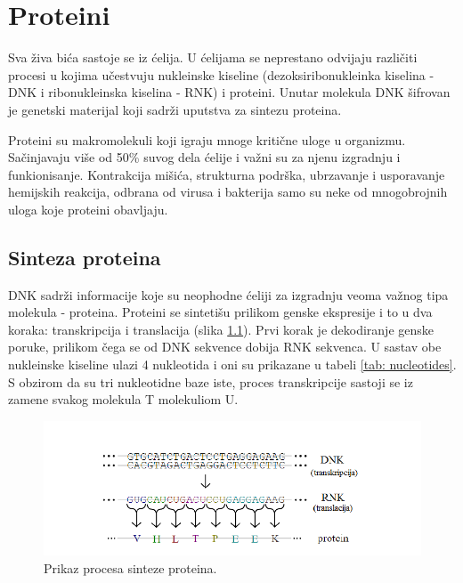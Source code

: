 \chapter{Proteini} %
\label{Chapter2}

Sva živa bića sastoje se iz ćelija. U ćelijama se neprestano odvijaju različiti procesi u kojima učestvuju nukleinske kiseline (dezoksiribonukleinka kiselina - DNK i ribonukleinska kiselina - RNK) i proteini. Unutar molekula DNK šifrovan je genetski materijal koji sadrži uputstva za sintezu proteina. 

Proteini su makromolekuli koji igraju mnoge kritične uloge u organizmu. Sačinjavaju više od 50\% suvog dela ćelije i važni su za njenu izgradnju i funkionisanje. Kontrakcija mišića, strukturna podrška, ubrzavanje i usporavanje hemijskih reakcija, odbrana od virusa i bakterija samo su neke od mnogobrojnih uloga koje proteini obavljaju. \cite{radivojac, doktJK} 


\section{Sinteza proteina}

DNK sadrži informacije koje su neophodne ćeliji za izgradnju veoma važnog tipa molekula - proteina. Proteini se sintetišu prilikom genske ekspresije i to u dva koraka: transkripcija i translacija (slika \ref{fig:synthesis}).  Prvi korak je dekodiranje genske poruke, prilikom čega se od DNK sekvence dobija RNK sekvenca. U sastav obe nukleinske kiseline ulazi 4 nukleotida i oni su prikazane u tabeli \ref{tab: nucleotides}. S obzirom da su tri nukleotidne baze iste, proces transkripcije sastoji se iz zamene svakog molekula T molekuliom U. 


\begin{figure}[h]
	\centering
	\includegraphics[width=\textwidth]{Figures/protein_synthesis.png}
	\caption{Prikaz procesa sinteze proteina.}
	\label{fig:synthesis}
\end{figure}


